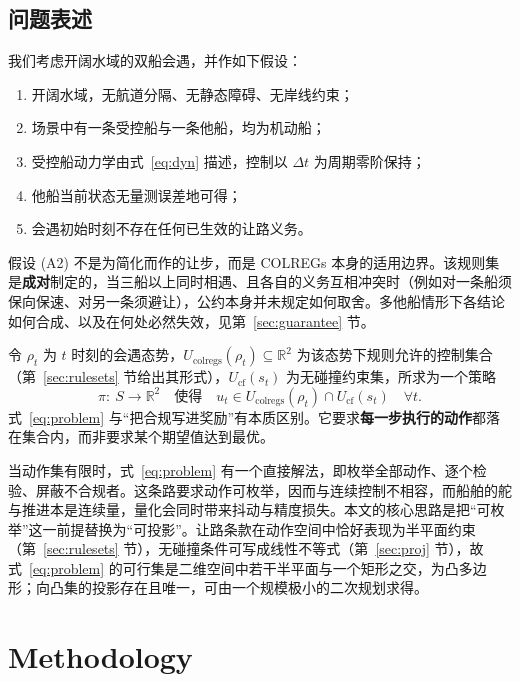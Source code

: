 \documentclass[12pt,letterpaper]{article}
\begin{document}
\subsection{问题表述}
\label{sec:problem}

我们考虑开阔水域的双船会遇，并作如下假设：

\begin{enumerate}\itemsep1pt
 \item[(A1)] 开阔水域，无航道分隔、无静态障碍、无岸线约束；
 \item[(A2)] 场景中有一条受控船与一条他船，均为机动船；
 \item[(A3)] 受控船动力学由式~\eqref{eq:dyn} 描述，控制以 $\Delta t$ 为周期零阶保持；
 \item[(A4)] 他船当前状态无量测误差地可得；
 \item[(A5)] 会遇初始时刻不存在任何已生效的让路义务。
\end{enumerate}

假设 (A2) 不是为简化而作的让步，而是 COLREGs 本身的适用边界。该规则集是\textbf{成对}制定的，当三船以上同时相遇、且各自的义务互相冲突时（例如对一条船须保向保速、对另一条须避让），公约本身并未规定如何取舍。多他船情形下各结论如何合成、以及在何处必然失效，见第~\ref{sec:guarantee} 节。

令 $\rho_t$ 为 $t$ 时刻的会遇态势，$U_{\mathrm{colregs}}(\rho_t)\subseteq\mathbb{R}^2$ 为该态势下规则允许的控制集合（第~\ref{sec:rulesets} 节给出其形式），$U_{\mathrm{cf}}(s_t)$ 为无碰撞约束集，所求为一个策略
\begin{equation}
 \pi:\ S\rightarrow\mathbb{R}^2
 \quad\text{使得}\quad
 u_t\in U_{\mathrm{colregs}}(\rho_t)\cap U_{\mathrm{cf}}(s_t)
 \quad \forall t.
 \label{eq:problem}
\end{equation}
式~\eqref{eq:problem} 与“把合规写进奖励”有本质区别。它要求\textbf{每一步执行的动作}都落在集合内，而非要求某个期望值达到最优。

当动作集有限时，式~\eqref{eq:problem} 有一个直接解法，即枚举全部动作、逐个检验、屏蔽不合规者。这条路要求动作可枚举，因而与连续控制不相容，而船舶的舵与推进本是连续量，量化会同时带来抖动与精度损失。本文的核心思路是把“可枚举”这一前提替换为“可投影”。让路条款在动作空间中恰好表现为半平面约束（第~\ref{sec:rulesets} 节），无碰撞条件可写成线性不等式（第~\ref{sec:proj} 节），故式~\eqref{eq:problem} 的可行集是二维空间中若干半平面与一个矩形之交，为凸多边形；向凸集的投影存在且唯一，可由一个规模极小的二次规划求得。


\section{Methodology}
\label{sec:method}
\end{document}
